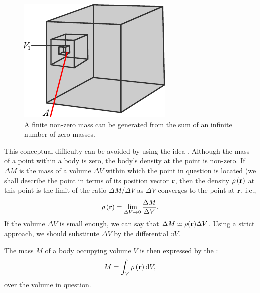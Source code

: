 \begin{figure}
 \centering
 \includegraphics[width=0.9\linewidth]{figures/cubes.pdf}
\caption{A finite non-zero mass can be generated from the sum of an infinite number of zero masses.\label{cubes}}
 \end{figure}

 This conceptual difﬁculty can
be avoided by using the idea . Although the mass of a
point within a body is zero, the body's density at the point is
non-zero. If $\Delta M$ is the mass of a volume $\Delta V$ within which
the point in question is located (we shall describe the point in terms
of its position vector $\vb{r}$, then the density $\rho \, (\vb{r})$ at
this point is the limit of the ratio $ \Delta M/ \Delta V$ as $\Delta V$ converges to the
point at $\vb{r}$, i.e.,
\begin{equation*}%
\rho \, (\vb{r}) = \lim_{\Delta V \to 0}  \frac{\Delta M}{\Delta V}.
\end{equation*}
If the volume $\Delta V$ is small enough, we can say that $\Delta M
\simeq \rho (\vb{r}) \Delta V$. Using a strict approach, we should
substitute $\Delta V$ by the differential $\dd V$.

The mass $M$ of a body occupying volume $V$ is then expressed by the
:
\begin{equation*}%
  M = \int_{V} \rho \,  (\vb{r}) \, \dd V,
\end{equation*}
over the volume in question.


